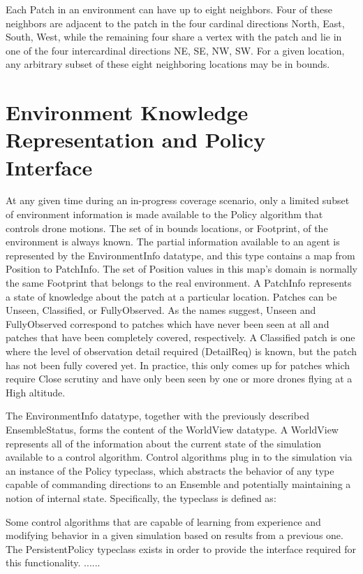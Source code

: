 Each Patch in an environment can have up to eight neighbors. Four of these neighbors are adjacent to the patch in the four cardinal directions {North, East, South, West}, while the remaining four share a vertex with the patch and lie in one of the four intercardinal directions {NE, SE, NW, SW}. For a given location, any arbitrary subset of these eight neighboring locations may be in bounds.


\section{Environment Knowledge Representation and Policy Interface}

At any given time during an in-progress coverage scenario, only a limited subset of environment information is made available to the Policy algorithm that controls drone motions. The set of in bounds locations, or Footprint, of the environment is always known. The partial information available to an agent is represented by the EnvironmentInfo datatype, and this type contains a map from Position to PatchInfo. The set of Position values in this map's domain is normally the same Footprint that belongs to the real environment. A PatchInfo represents a state of knowledge about the patch at a particular location. Patches can be Unseen, Classified, or FullyObserved. As the names suggest, Unseen and FullyObserved correspond to patches which have never been seen at all and patches that have been completely covered, respectively. A Classified patch is one where the level of observation detail required (DetailReq) is known, but the patch has not been fully covered yet. In practice, this only comes up for patches which require Close scrutiny and have only been seen by one or more drones flying at a High altitude.

The EnvironmentInfo datatype, together with the previously described EnsembleStatus, forms the content of the WorldView datatype. A WorldView represents all of the information about the current state of the simulation available to a control algorithm. Control algorithms plug in to the simulation via an instance of the Policy typeclass, which abstracts the behavior of any type capable of commanding directions to an Ensemble and potentially maintaining a notion of internal state. Specifically, the typeclass is defined as:



Some control algorithms that are capable of learning from experience and modifying behavior in a given simulation based on results from a previous one. The PersistentPolicy typeclass exists in order to provide the interface required for this functionality. ......  


